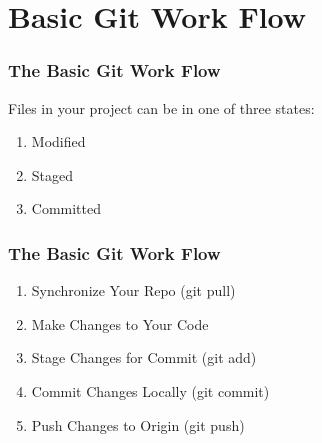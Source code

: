 
\section[Basic Git]{Basic Git Work Flow}

\begin{frame}
\frametitle{\large The Basic Git Work Flow}
Files in your project can be in one of three states:
\begin{enumerate}
\item Modified
\item Staged
\item Committed
\end{enumerate}
\end{frame}

\begin{frame}
\frametitle{\large The Basic Git Work Flow}
\begin{enumerate}
\item Synchronize Your Repo (git pull)
\item Make Changes to Your Code
\item Stage Changes for Commit (git add)
\item Commit Changes Locally (git commit)
\item Push Changes to Origin (git push)
\end{enumerate}
\end{frame}
\note{}